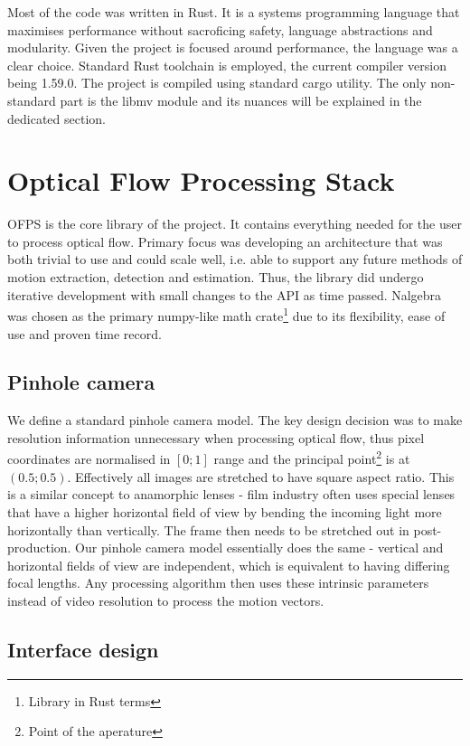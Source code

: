 \documentclass[11pt,english]{report}
\begin{document}
Most of the code was written in Rust. It is a systems programming language that maximises performance without sacroficing safety, language abstractions and modularity. Given the project is focused around performance, the language was a clear choice. Standard Rust toolchain is employed, the current compiler version being 1.59.0. The project is compiled using standard cargo utility. The only non-standard part is the libmv module and its nuances will be explained in the dedicated section.

\section{Optical Flow Processing Stack}

OFPS is the core library of the project. It contains everything needed for the user to process optical flow. Primary focus was developing an architecture that was both trivial to use and could scale well, i.e. able to support any future methods of motion extraction, detection and estimation. Thus, the library did undergo iterative development with small changes to the API as time passed. Nalgebra was chosen as the primary numpy-like math crate\footnote{Library in Rust terms} due to its flexibility, ease of use and proven time record.

\subsection{Pinhole camera}

We define a standard pinhole camera model. The key design decision was to make resolution information unnecessary when processing optical flow, thus pixel coordinates are normalised in $[0; 1]$ range and the principal point\footnote{Point of the aperature} is at $(0.5; 0.5)$. Effectively all images are stretched to have square aspect ratio. This is a similar concept to anamorphic lenses - film industry often uses special lenses that have a higher horizontal field of view by bending the incoming light more horizontally than vertically. The frame then needs to be stretched out in post-production. Our pinhole camera model essentially does the same - vertical and horizontal fields of view are independent, which is equivalent to having differing focal lengths. Any processing algorithm then uses these intrinsic parameters instead of video resolution to process the motion vectors.

\subsection{Interface design}
\end{document}
